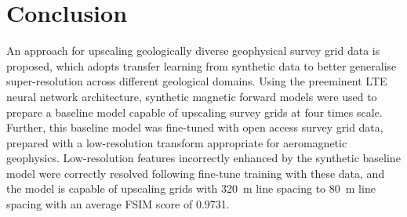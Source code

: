 \section{Conclusion}
\label{sec:2conclusion}
An approach for upscaling geologically diverse geophysical survey grid data is proposed, which adopts transfer learning from synthetic data to better generalise super-resolution across different geological domains.
Using the preeminent LTE neural network architecture, synthetic magnetic forward models were used to prepare a baseline model capable of upscaling survey grids at four times scale.
Further, this baseline model was fine-tuned with open access survey grid data, prepared with a low-resolution transform appropriate for aeromagnetic geophysics.
Low-resolution features incorrectly enhanced by the synthetic baseline model were correctly resolved following fine-tune training with these data, and the model is capable of upscaling grids with \qty{320}{\m} line spacing to \qty{80}{\m} line spacing with an average FSIM score of \num{0.9731}.




% 
